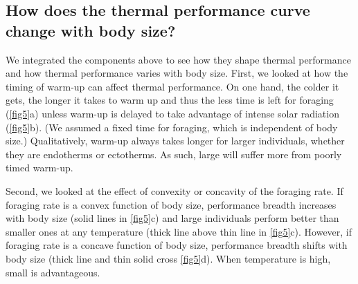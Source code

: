 


\subsection*{How does the thermal performance curve change with body size?}

We integrated the components above to see how they shape thermal performance and how thermal performance varies with body size.
First, we looked at how the timing of warm-up can affect thermal performance.
On one hand, the colder it gets, the longer it takes to warm up and thus the less time is left for foraging (\cref{fig5}a) unless warm-up is delayed to take advantage of intense solar radiation (\cref{fig5}b).
(We assumed a fixed time for foraging, which is independent of body size.)  %
Qualitatively, warm-up always takes longer for larger individuals, whether they are endotherms or ectotherms. %
As such, large will suffer more from poorly timed warm-up.

Second, we looked at the effect of convexity or concavity of the foraging rate.
If foraging rate is a convex function of body size, performance breadth increases with body size (solid lines in \cref{fig5}c) and large individuals perform better than smaller ones at any temperature (thick line above thin line in \cref{fig5}c).
However, if foraging rate is a concave function of body size, performance breadth shifts with body size (thick line and thin solid cross \cref{fig5}d).
When temperature is high, small is advantageous.

